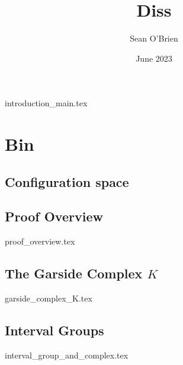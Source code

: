 \documentclass{article}
\title{Diss}
\author{Sean O'Brien}
\date{June 2023}
\begin{document}
\maketitle

{introduction_main.tex}


\section{Bin}

\subsection{Configuration space}


\subsection{Proof Overview}
{proof_overview.tex}

\subsection{The Garside Complex $K$}
{garside_complex_K.tex}
\subsection{Interval Groups}
{interval_group_and_complex.tex}


\printbibliography
\end{document}
